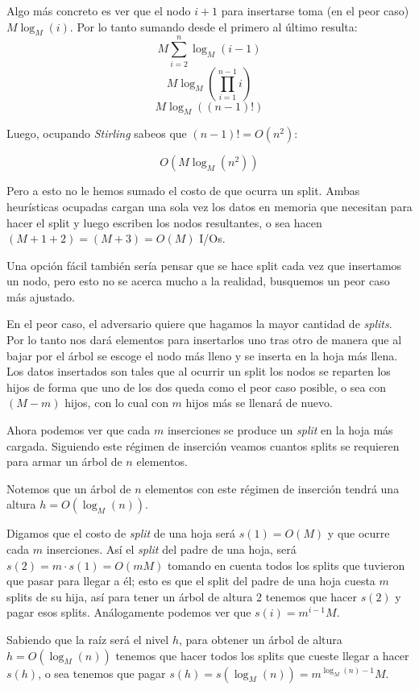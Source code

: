 \documentclass[letterpaper,11pt]{article} %
\begin{document}
			Algo más concreto es ver que el nodo $i+1$ para insertarse toma (en el peor caso) $M \log_{M}(i)$. Por lo tanto sumando desde el primero al último resulta:
			$$ M \sum_{i=2}^{n} \log_{M}(i-1)$$
			$$ M \log_{M}(\prod_{i=1}^{n-1} i)$$
			$$ M \log_{M}((n-1)!)$$
			
			Luego, ocupando \textit{Stirling} sabeos que $(n-1)! = O(n^{2})$:
			
			$$O(M \log_{M}(n^{2}))$$
			
			Pero a esto no le hemos sumado el costo de que ocurra un split. Ambas heurísticas ocupadas cargan una sola vez los datos en memoria que necesitan para hacer el split y luego escriben los nodos resultantes, o sea hacen $(M+1+2)=(M+3)= O(M)$ I/Os.
			
			Una opción fácil también sería pensar que se hace split cada vez que insertamos un nodo, pero esto no se acerca mucho a la realidad, busquemos un peor caso más ajustado.
			
			En el peor caso, el adversario quiere que hagamos la mayor cantidad de \textit{splits}. Por lo tanto nos dará elementos para insertarlos uno tras otro de manera que al bajar por el árbol se escoge el nodo más lleno y se inserta en la hoja más llena. Los datos insertados son tales que al ocurrir un split los nodos se reparten los hijos de forma que uno de los dos queda como el peor caso posible, o sea con $(M-m)$ hijos, con lo cual con $m$ hijos más se llenará de nuevo.
			
			Ahora podemos ver que cada $m$ inserciones se produce un \textit{split} en la hoja más cargada. Siguiendo este régimen de inserción veamos cuantos splits se requieren para armar un árbol de $n$ elementos.
			
			Notemos que un árbol de $n$ elementos con este régimen de inserción tendrá una altura $h = O(\log_{M}(n))$.
			
			Digamos que el costo de \textit{split} de una hoja será $s(1) = O(M)$ y que ocurre cada $m$ inserciones. Así el \textit{split} del padre de una hoja, será $s(2) = m\cdot s(1) = O(mM)$ tomando en cuenta todos los splits que tuvieron que pasar para llegar a él; esto es que el split del padre de una hoja cuesta $m$ splits de su hija, así para tener un árbol de altura 2 tenemos que hacer $s(2)$ y pagar esos splits. Análogamente podemos ver que $s(i) = m^{i-1}M$.
			
			Sabiendo que la raíz será el nivel $h$, para obtener un árbol de altura $h = O(\log_{M}(n))$ tenemos que hacer todos los splits que cueste llegar a hacer $s(h)$, o sea tenemos que pagar $s(h) = s(\log_{M}(n)) = m^{\log_{M}(n)-1}M$.\\
			
\end{document}
